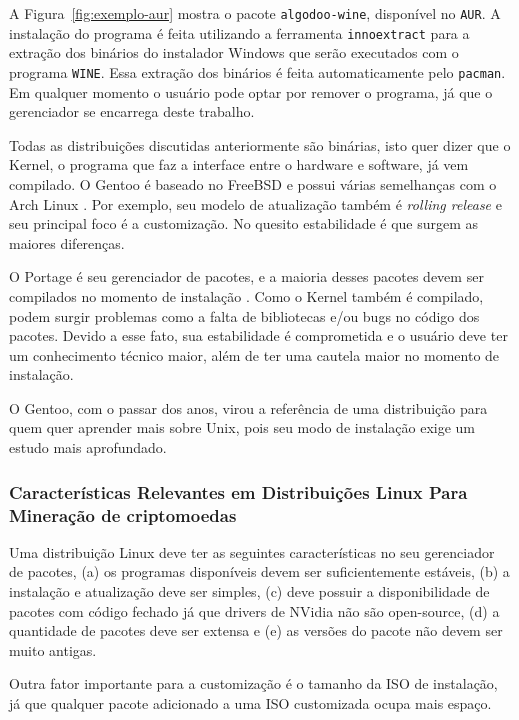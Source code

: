 \documentclass[
article,			%
12pt,				%
openright,			%
oneside,			%
a4paper,			%
chapter=TITLE,		%
section=TITLE,		%
subsection=TITLE,	%
subsubsection=TITLE,%
subsubsubsection=TITLE, %
english,			%
brazil,				%
]{abntex2}
\def\code#1{\texttt{#1}}
\begin{document}
A Figura~\ref{fig:exemplo-aur} mostra o pacote \code{algodoo-wine},
disponível no \code{AUR}. A instalação do programa é feita utilizando
a ferramenta \code{innoextract} para a extração dos binários do
instalador Windows que serão executados com o programa \code{WINE}.
Essa extração dos binários é feita automaticamente pelo \code{pacman}.
Em qualquer momento o usuário pode optar por remover o programa, já
que o gerenciador se encarrega deste trabalho.


Todas as distribuições discutidas anteriormente são binárias, isto
quer dizer que o Kernel, o programa que faz a interface entre o
hardware e software, já vem compilado. O Gentoo é baseado no FreeBSD e
possui várias semelhanças com o Arch Linux \cite{GentooFundation2018}.
Por exemplo, seu modelo de atualização também é \emph{rolling release}
e seu principal foco é a customização. No quesito estabilidade é que
surgem as maiores diferenças.

O Portage é seu gerenciador de pacotes, e a maioria desses pacotes
devem ser compilados no momento de instalação \cite{GentooWiki2018}.
Como o Kernel também é compilado, podem surgir problemas como a falta
de bibliotecas e/ou bugs no código dos pacotes. Devido a esse fato,
sua estabilidade é comprometida e o usuário deve ter um conhecimento
técnico maior, além de ter uma cautela maior no momento de instalação.

O Gentoo, com o passar dos anos, virou a referência de uma
distribuição para quem quer aprender mais sobre Unix, pois seu modo de
instalação exige um estudo mais aprofundado.

\subsubsection{Características Relevantes em Distribuições Linux Para Mineração de criptomoedas}

Uma distribuição Linux deve ter as seguintes características no seu
gerenciador de pacotes, (a) os programas disponíveis devem ser
suficientemente estáveis, (b) a instalação e atualização deve ser
simples, (c) deve possuir a disponibilidade de pacotes com código
fechado já que drivers de NVidia não são open-source, (d) a quantidade
de pacotes deve ser extensa e (e) as versões do pacote não devem ser
muito antigas.

Outra fator importante para a customização é o tamanho da ISO de
instalação, já que qualquer pacote adicionado a uma ISO customizada
ocupa mais espaço.
\end{document}
